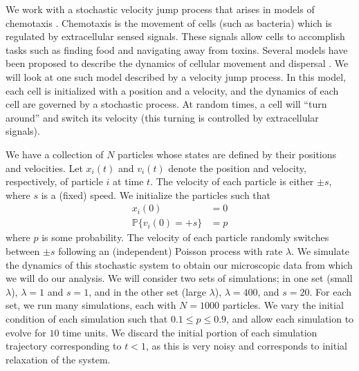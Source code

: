 \documentclass[prl, reprint, final, showkeys]{revtex4-1}
\begin{document}


We work with a stochastic velocity jump process that arises in models of chemotaxis \cite{othmer2000diffusion}.
%
Chemotaxis is the movement of cells (such as bacteria) which is regulated by extracellular sensed signals.
%
These signals allow cells to accomplish tasks such as finding food and navigating away from toxins.
%
Several models have been proposed to describe the dynamics of cellular movement and dispersal \cite{othmer1988models, codling2008random}.
%
We will look at one such model described by a velocity jump process.
%
In this model, each cell is initialized with a position and a velocity, and the dynamics of each cell are governed by a stochastic process.
%
At random times, a cell will ``turn around'' and switch its velocity (this turning is controlled by extracellular signals). 
%


We have a collection of $N$ particles whose states are defined by their positions and velocities. 
%
Let $x_i(t)$ and $v_i(t)$ denote the position and velocity, respectively, of particle $i$ at time $t$.
%
The velocity of each particle is either $\pm s$, where $s$ is a (fixed) speed. 
%
We initialize the particles such that
\begin{equation}
\begin{aligned}
x_i(0) & = 0 \\
\mathbb{P} \{ v_i(0) = +s \} & = p
\end{aligned}
\end{equation}
where $p$ is some probability.
%
The velocity of each particle randomly switches between $\pm s$ following an (independent) Poisson process with rate $\lambda$.
%
We simulate the dynamics of this stochastic system to obtain our microscopic data from which we will do our analysis.
%
We will consider two sets of simulations;
in one set (small $\lambda$), $\lambda = 1$ and $s=1$, and in the other set (large $\lambda$), $\lambda = 400$, and $s=20$.
%
For each set, we run many simulations, each with $N=1000$ particles.
%
We vary the initial condition of each simulation such that $0.1 \le p  \le 0.9$, and allow each simulation to evolve for $10$ time units.
%
We discard the initial portion of each simulation trajectory corresponding to $t < 1$, as this is very noisy and corresponds to initial relaxation of the system.
\end{document}
